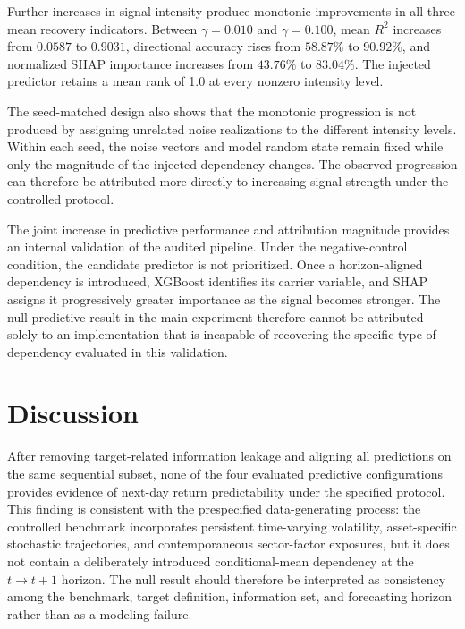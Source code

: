 \documentclass[utf8]{FrontiersinHarvard} %
\begin{document}
Further increases in signal intensity produce monotonic improvements in all three mean recovery indicators. Between \(\gamma=0.010\) and \(\gamma=0.100\), mean \(R^2\) increases from \(0.0587\) to \(0.9031\), directional accuracy rises from \(58.87\%\) to \(90.92\%\), and normalized SHAP importance increases from \(43.76\%\) to \(83.04\%\). The injected predictor retains a mean rank of 1.0 at every nonzero intensity level.

The seed-matched design also shows that the monotonic progression is not produced by assigning unrelated noise realizations to the different intensity levels. Within each seed, the noise vectors and model random state remain fixed while only the magnitude of the injected dependency changes. The observed progression can therefore be attributed more directly to increasing signal strength under the controlled protocol.

The joint increase in predictive performance and attribution magnitude provides an internal validation of the audited pipeline. Under the negative-control condition, the candidate predictor is not prioritized. Once a horizon-aligned dependency is introduced, XGBoost identifies its carrier variable, and SHAP assigns it progressively greater importance as the signal becomes stronger. The null predictive result in the main experiment therefore cannot be attributed solely to an implementation that is incapable of recovering the specific type of dependency evaluated in this validation.

\section{Discussion}
\label{sec:discussion}

After removing target-related information leakage and aligning all predictions on the same sequential subset, none of the four evaluated predictive configurations provides evidence of next-day return predictability under the specified protocol. This finding is consistent with the prespecified data-generating process: the controlled benchmark incorporates persistent time-varying volatility, asset-specific stochastic trajectories, and contemporaneous sector-factor exposures, but it does not contain a deliberately introduced conditional-mean dependency at the \(t\rightarrow t+1\) horizon. The null result should therefore be interpreted as consistency among the benchmark, target definition, information set, and forecasting horizon rather than as a modeling failure.
\end{document}
